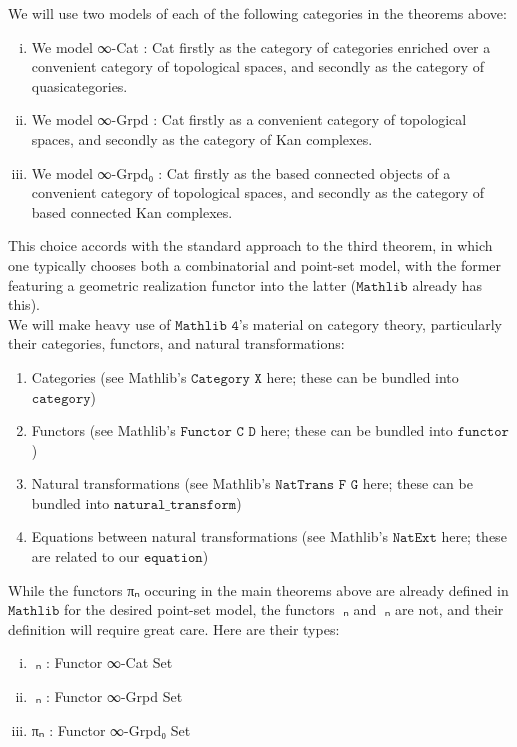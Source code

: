 \documentclass{book}
\theoremstyle{definition}
\begin{document}
We will use two models of each of the following categories in the theorems above:

\begin{enumerate}[(i)]
\item We model ∞-Cat : Cat firstly as the category of categories enriched over a convenient category of topological spaces, and secondly as the category of quasicategories.
\item We model ∞-Grpd : Cat firstly as a convenient category of topological spaces, and secondly as the category of Kan complexes.
\item We model ∞-Grpd₀ : Cat firstly as the based connected objects of a convenient category of topological spaces, and secondly as the category of based connected Kan complexes.
\end{enumerate}

This choice accords with the standard approach to the third theorem, in which one typically chooses both a combinatorial and point-set model, with the former featuring a geometric realization functor into the latter ($\texttt{Mathlib}$ already has this).\\

We will make heavy use of $\texttt{Mathlib 4}$'s material on category theory, particularly their categories, functors, and natural transformations:

\begin{enumerate}
\item Categories (see Mathlib's $\texttt{Category X}$ here; these can be bundled into $\texttt{category}$)
\item Functors (see Mathlib's $\texttt{Functor C D}$ here; these can be bundled into $\texttt{functor}$)
\item Natural transformations (see Mathlib's $\texttt{NatTrans F G}$ here; these can be bundled into $\texttt{natural\_transform}$)
\item Equations between natural transformations (see Mathlib's $\texttt{NatExt}$ here; these are related to our $\texttt{equation}$)
\end{enumerate}

While the functors πₙ occuring in the main theorems above are already defined in $\texttt{Mathlib}$ for the desired point-set model, the functors π⃗ₙ and π⃡ₙ are not, and their definition will require great care. Here are their types:

\begin{enumerate}[(i)]
\item π⃗ₙ : Functor ∞-Cat Set
\item π⃡ₙ : Functor ∞-Grpd Set
\item πₙ : Functor ∞-Grpd₀ Set
\end{enumerate}
\end{document}
